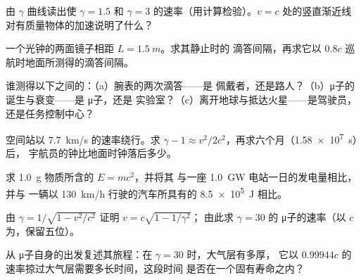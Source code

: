 \begin{exercise}[$\star\star$]\label{exo:g12:special-relativity:7}
由 $\gamma$ 曲线读出使 $\gamma = 1.5$ 和
$\gamma = 3$ 的速率（用计算检验）。$v = c$ 处的竖直渐近线
对有质量物体的加速说明了什么？
\end{exercise}

\begin{exercise}[$\star\star$]\label{exo:g12:special-relativity:8}
一个光钟的两面镜子相距 $L = \qty{1.5}{m}$。求其静止时的
滴答间隔，再求它以 $0.8c$ 巡航时地面所测得的滴答间隔。
\end{exercise}

\begin{exercise}[$\star\star$]\label{exo:g12:special-relativity:9}
谁测得以下之间的：（a）腕表的两次滴答——是
佩戴者，还是路人？（b）μ子的诞生与衰变——是 μ子，还是
实验室？（c）离开地球与抵达火星——是驾驶员，还是任务控制中心？
\end{exercise}

\begin{exercise}[$\star\star$]\label{exo:g12:special-relativity:10}
空间站以 \qty{7.7}{km/s} 的速率绕行。求
$\gamma - 1 \approx v^2/2c^2$，再求六个月（\qty{1.58e7}{s}）后，
宇航员的钟比地面时钟落后多少。
\end{exercise}

\begin{exercise}[$\star\star$]\label{exo:g12:special-relativity:11}
求 \qty{1.0}{g} 物质所含的 $E = mc^2$，并将其
与一座 \qty{1.0}{GW} 电站一日的发电量相比，并与
一辆以 \qty{130}{km/h} 行驶的汽车所具有的 \qty{8.5e5}{J} 相比。
\end{exercise}

\begin{exercise}[$\star\star\star$]\label{exo:g12:special-relativity:12}
由 $\gamma = 1/\sqrt{1 - v^2/c^2}$ 证明 $v = c\sqrt{1 - 1/\gamma^2}$；
由此求 $\gamma = 30$ 的 μ子的速率（以
$c$ 为，保留五位）。
\end{exercise}

\begin{exercise}[$\star\star\star$]\label{exo:g12:special-relativity:13}
从 μ子自身的出发复述其旅程：在 $\gamma = 30$ 时，大气层有多厚，
它以 $0.99944c$ 的速率掠过大气层需要多长时间，这段时间
是否在一个固有寿命之内？
\end{exercise}

